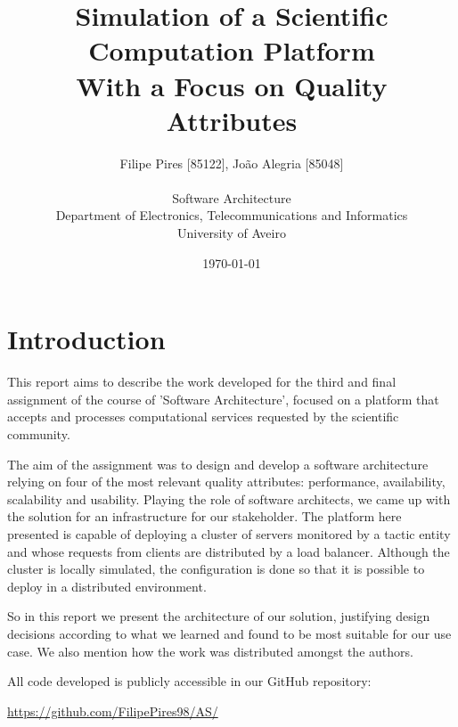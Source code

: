 \documentclass[12pt]{article}
\title{Simulation of a Scientific Computation Platform\\With a Focus on Quality Attributes}
\author
{Filipe Pires [85122], João Alegria [85048]\\
\\
Software Architecture\\
\normalsize{Department of Electronics, Telecommunications and Informatics}\\
\normalsize{University of Aveiro}\\
}
\date{\today{}}
\begin{document}
\baselineskip18pt

\maketitle

\section*{Introduction} %

This report aims to describe the work developed for the third and final assignment of the course of 'Software Architecture', focused on a platform that accepts
and processes computational services requested by the scientific community.

The aim of the assignment was to design and develop a software architecture relying on four of the most relevant quality attributes:
performance, availability, scalability and usability.
Playing the role of software architects, we came up with the solution for an infrastructure for our stakeholder.
The platform here presented is capable of deploying a cluster of servers monitored by a tactic entity and whose requests from clients are distributed by a load balancer.
Although the cluster is locally simulated, the configuration is done so that it is possible to deploy in a distributed environment.

So in this report we present the architecture of our solution, justifying design decisions according to what we learned and found to be most suitable for our use case.
We also mention how the work was distributed amongst the authors.

All code developed is publicly accessible in our GitHub repository:

\url{https://github.com/FilipePires98/AS/}

\end{document}
